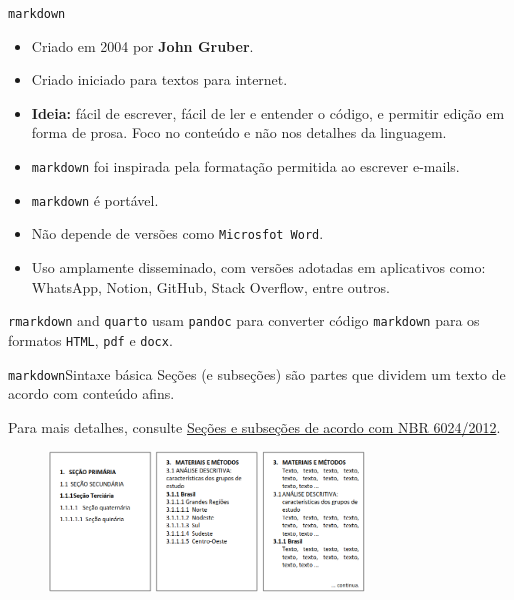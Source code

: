 \documentclass[
  10pt,
  ignorenonframetext,
]{beamer}
\providecommand{\tightlist}{%
  \setlength{\itemsep}{0pt}\setlength{\parskip}{0pt}}\usepackage{longtable,booktabs,array}
\begin{document}
\begin{frame}[fragile]{\texttt{markdown}}
\protect\hypertarget{markdown-1}{}
\begin{itemize}
\tightlist
\item
  Criado em 2004 por \textbf{John Gruber}.
\item
  Criado iniciado para textos para internet.
\item
  \textbf{Ideia:} fácil de escrever, fácil de ler e entender o código, e
  permitir edição em forma de prosa. Foco no conteúdo e não nos detalhes
  da linguagem.
\item
  \texttt{markdown} foi inspirada pela formatação permitida ao escrever
  e-mails.
\item
  \texttt{markdown} é portável.
\item
  Não depende de versões como \texttt{Microsfot\ Word}.
\item
  Uso amplamente disseminado, com versões adotadas em aplicativos como:
  WhatsApp, Notion, GitHub, Stack Overflow, entre outros.
\end{itemize}

\texttt{rmarkdown} and \texttt{quarto} usam \texttt{pandoc} para
converter código \texttt{markdown} para os formatos \texttt{HTML},
\texttt{pdf} e \texttt{docx}.
\end{frame}

\begin{frame}{\texttt{markdown}\newline Sintaxe básica}
\protect\hypertarget{markdownsintaxe-buxe1sica}{}
Seções (e subseções) são partes que dividem um texto de acordo com
conteúdo afins.

Para mais detalhes, consulte
\href{https://www.bccl.unicamp.br/wp-content/uploads/2020/08/Manual-de-numera\%C3\%A7\%C3\%A3o-progressiva-das-secoes-de-um-documento_BCCL.pdf}{Seções
e subseções de acordo com NBR 6024/2012}.

\begin{figure}

{\centering \includegraphics[width=0.75\textwidth,height=\textheight]{figuras/secao-subsecao.png}

}

\end{figure}
\end{frame}
\end{document}
